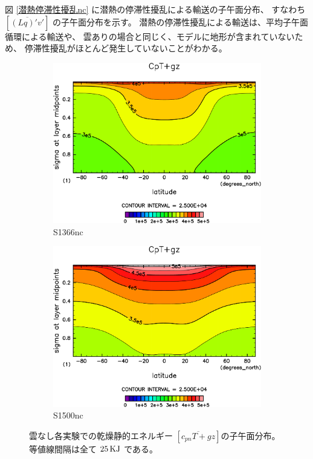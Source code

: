 \documentclass[body]{subfiles}
\begin{document}
図 \ref{潜熱停滞性擾乱nc} に潜熱の停滞性擾乱による輸送の子午面分布、
すなわち \([\overline{(Lq)'v'}]\) の子午面分布を示す。
潜熱の停滞性擾乱による輸送は、平均子午面循環による輸送や、
雲ありの場合と同じく、モデルに地形が含まれていないため、
停滞性擾乱がほとんど発生していないことがわかる。

\afterpage{\clearpage}

\begin{figure}[t]
	\centering
	\begin{subfigure}{.4\textwidth}
		\centering
		\includegraphics[width=\textwidth]{S1366-nc/CpT+gz,time=3650:4015-crop-rotate.pdf}
		\caption{S1366nc}\label{CpT+gzS1366nc}
	\end{subfigure}
	\begin{subfigure}{.4\textwidth}
		\centering
		\includegraphics[width=\textwidth]{S1500-nc/CpT+gz,time=3650:4015-crop-rotate.pdf}
		\caption{S1500nc}\label{CpT+gzS1500nc}
	\end{subfigure}
	\caption[雲なし各実験での乾燥静的エネルギーの子午面分布]{
		雲なし各実験での乾燥静的エネルギー \([\overline{c_{pn}T+gz}]\)の子午面分布。
		等値線間隔は全て \(25\hmu{KJ}\) である。
	}\label{Cp+gznc}
\end{figure}
\end{document}

